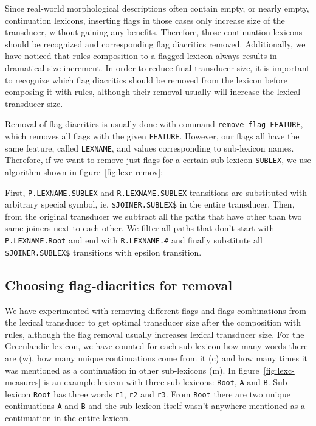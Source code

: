 \documentclass[10pt, a4paper]{article}
\begin{document}
Since real-world morphological descriptions often contain empty, or nearly
empty, continuation lexicons, inserting flags in those cases only
increase size of the transducer, without gaining any
benefits. Therefore, those continuation lexicons should be recognized and corresponding flag diacritics removed.
Additionally, we have noticed that rules composition to a flagged lexicon always results in dramatical size
increment. In order to reduce final transducer size, it is important to recognize which flag diacritics should be removed from the lexicon 
before composing it with rules, although their removal usually will increase the lexical transducer size.  

Removal of flag diacritics is usually done with command \verb+remove-flag-FEATURE+, which removes all flags with the given \verb+FEATURE+. However, 
our flags all have the same feature, called \verb+LEXNAME+, and values corresponding to sub-lexicon names. Therefore, if we want to remove just flags 
for a certain sub-lexicon \verb+SUBLEX+, we use algorithm shown in figure~\ref{fig:lexc-remov}:

First, \verb+P.LEXNAME.SUBLEX+ and \verb+R.LEXNAME.SUBLEX+ transitions are substituted with arbitrary special symbol, ie. 
\verb+$JOINER.SUBLEX$+ in the entire transducer. 
Then, from the original transducer we subtract all the paths that have other than two same joiners next to each other. We filter all paths that 
don't start with \verb+P.LEXNAME.Root+ and end with \verb+R.LEXNAME.#+ and finally substitute all \verb+$JOINER.SUBLEX$+ transitions with epsilon transition.

\subsection{Choosing flag-diacritics for removal}

We have experimented with removing different flags and flags combinations from the lexical transducer 
to get optimal transducer size after the composition with rules, although the flag removal usually increases lexical transducer size. 
For the Greenlandic lexicon, we have counted 
for each sub-lexicon how many words there are (w), how many unique continuations come from it (c) and how many times it 
was mentioned as a continuation in other sub-lexicons (m). In figure~\ref{fig:lexc-measures} is an example lexicon 
with three sub-lexicons: \verb+Root+, \verb+A+ and \verb+B+. Sub-lexicon \verb+Root+ has three words \verb+r1+, \verb+r2+ and \verb+r3+. 
From \verb+Root+ there are two unique continuations \verb+A+ and \verb+B+ and the sub-lexicon itself wasn't anywhere mentioned as a continuation in the entire lexicon.
\end{document}
